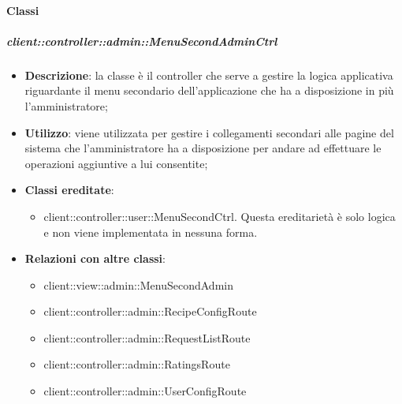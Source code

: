 	\paragraph{Classi} %
		\subparagraph{client::controller::admin::MenuSecondAdminCtrl} %
		\label{subp:bdsm_app_client_controller_admin_menusecondadminctrl}
			\begin{itemize}
				\item \textbf{Descrizione}: la classe è il controller che serve a gestire la logica applicativa riguardante il menu secondario dell'applicazione che ha a disposizione in più l'amministratore;
				\item \textbf{Utilizzo}: viene utilizzata per gestire i collegamenti secondari alle pagine del sistema che l'amministratore ha a disposizione per andare ad effettuare le operazioni aggiuntive a lui consentite;
				\item \textbf{Classi ereditate}:
					\begin{itemize}
						\item client::controller::user::MenuSecondCtrl. Questa ereditarietà è solo logica e non viene implementata in nessuna forma.
					\end{itemize}
				\item \textbf{Relazioni con altre classi}:
					\begin{itemize}
						\item client::view::admin::MenuSecondAdmin
						\item client::controller::admin::RecipeConfigRoute
						\item client::controller::admin::RequestListRoute
						\item client::controller::admin::RatingsRoute
						\item client::controller::admin::UserConfigRoute
					\end{itemize}
			\end{itemize}

